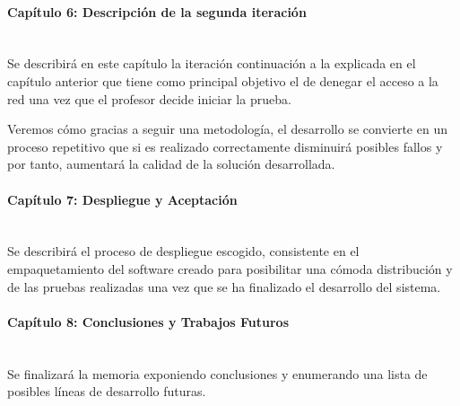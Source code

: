 \paragraph{Capítulo 6: Descripción de la segunda iteración} \ \\

Se describirá en este capítulo la iteración continuación a la explicada en el capítulo anterior que tiene como principal objetivo el de denegar el acceso a la red una vez que el profesor decide iniciar la prueba.
\newline

Veremos cómo gracias a seguir una metodología, el desarrollo se convierte en un proceso repetitivo que si es realizado correctamente disminuirá posibles fallos y por tanto, aumentará la calidad de la solución desarrollada.


\paragraph{Capítulo 7: Despliegue y Aceptación} \ \\


Se describirá el proceso de despliegue escogido, consistente en el empaquetamiento del software creado para posibilitar una cómoda distribución y de las pruebas realizadas una vez que se ha finalizado el desarrollo del sistema.


\paragraph{Capítulo 8: Conclusiones y Trabajos Futuros} \ \\

Se finalizará la memoria exponiendo conclusiones y enumerando una lista de posibles líneas de desarrollo futuras. 